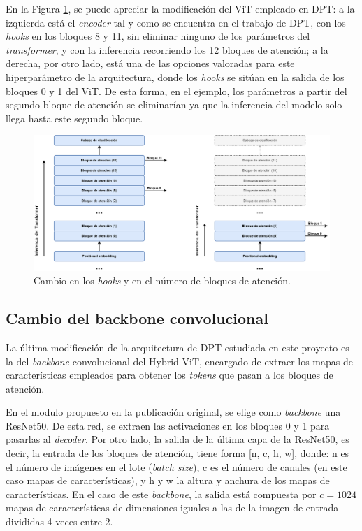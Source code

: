 En la Figura \ref{fig:attention_block_num}, se puede apreciar la modificación del ViT empleado en DPT: a la izquierda está el \textit{encoder} tal y como se encuentra en el trabajo de DPT, con los \textit{hooks} en los bloques 8 y 11, sin eliminar ninguno de los parámetros del \textit{transformer}, y con la inferencia recorriendo los 12 bloques de atención; a la derecha, por otro lado, está una de las opciones valoradas para este hiperparámetro de la arquitectura, donde los \textit{hooks} se sitúan en la salida de los bloques 0 y 1 del ViT. De esta forma, en el ejemplo, los parámetros a partir del segundo bloque de atención se eliminarían ya que la inferencia del modelo solo llega hasta este segundo bloque.

\begin{figure}[H]
\centering
\includegraphics[width=\textwidth]{imagenes/DPT-cambio-bloques-transformer.png}
\caption{Cambio en los \textit{hooks} y en el número de bloques de atención.}
\label{fig:attention_block_num}
\end{figure}

\subsection{Cambio del backbone convolucional}
La última modificación de la arquitectura de DPT estudiada en este proyecto es la del \textit{backbone} convolucional del Hybrid ViT, encargado de extraer los mapas de características empleados para obtener los \textit{tokens} que pasan a los bloques de atención. 

En el modulo propuesto en la publicación original, se elige como \textit{backbone} una ResNet50. De esta red, se extraen las activaciones en los bloques 0 y 1 para pasarlas al \textit{decoder}. Por otro lado, la salida de la última capa de la ResNet50, es decir, la entrada de los bloques de atención, tiene forma [n, c, h, w], donde: n es el número de imágenes en el lote (\textit{batch size}), c es el número de canales (en este caso mapas de características), y h y w la altura y anchura de los mapas de características. En el caso de este \textit{backbone}, la salida está compuesta por $c=1024$ mapas de características de dimensiones iguales a las de la imagen de entrada divididas 4 veces entre 2.

